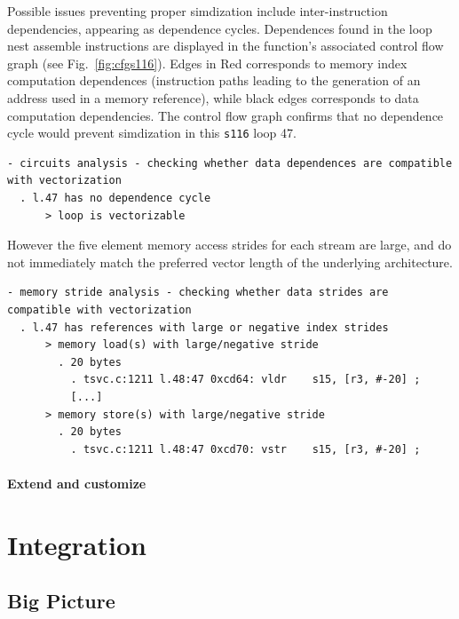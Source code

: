 \documentclass[11pt, a4paper, twoside]{montblanc2}
\begin{document}
Possible issues preventing proper simdization include inter-instruction
dependencies, appearing as dependence cycles. Dependences found in the loop nest
assemble instructions are displayed in the function's associated control flow
graph (see Fig.~\ref{fig:cfgs116}). Edges in Red corresponds to memory index computation
dependences (instruction paths leading to the generation of an address used in a
memory reference), while black edges corresponds to data computation dependencies. 
The control flow graph confirms that no dependence cycle would prevent
simdization in this \texttt{s116} loop 47.

\begin{small}
\begin{verbatim}
- circuits analysis - checking whether data dependences are compatible with vectorization
  . l.47 has no dependence cycle
      > loop is vectorizable
\end{verbatim}
\end{small}

However the five element memory access strides for each stream are large, and do not immediately
match the preferred vector length of the underlying architecture.

\begin{small}
\begin{verbatim}
- memory stride analysis - checking whether data strides are compatible with vectorization
  . l.47 has references with large or negative index strides
      > memory load(s) with large/negative stride
        . 20 bytes
          . tsvc.c:1211 l.48:47 0xcd64: vldr	s15, [r3, #-20] ;
          [...]
      > memory store(s) with large/negative stride
        . 20 bytes
          . tsvc.c:1211 l.48:47 0xcd70: vstr	s15, [r3, #-20] ;
\end{verbatim}
\end{small}

\paragraph{Extend and customize}

\section{Integration}

  \subsection{Big Picture}
\end{document}

